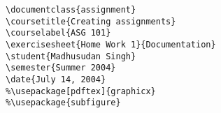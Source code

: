 \documentclass{article}
\begin{document}
    
\begin{verbatim}
\documentclass{assignment}
\coursetitle{Creating assignments}
\courselabel{ASG 101}
\exercisesheet{Home Work 1}{Documentation}
\student{Madhusudan Singh}
\semester{Summer 2004}
\date{July 14, 2004}
%\usepackage[pdftex]{graphicx}
%\usepackage{subfigure}
\end{verbatim}
\end{document}
